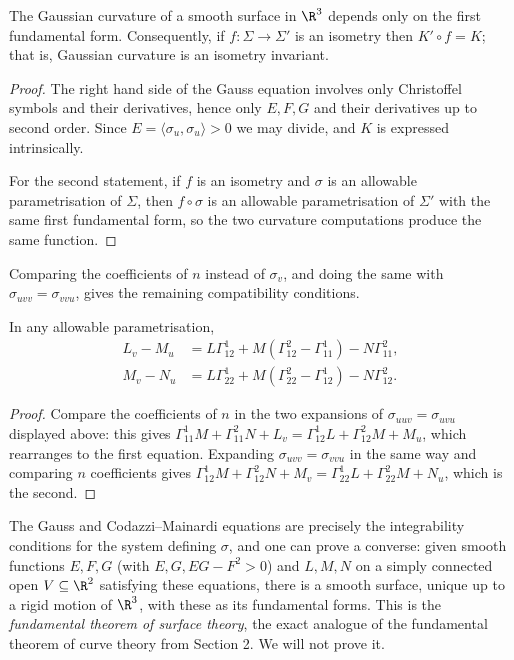\begin{theorem}
    The Gaussian curvature of a smooth surface in $\R^3$ depends only on the first fundamental form. Consequently, if $f: \Sigma \rightarrow \Sigma'$ is an isometry then $K' \circ f = K$; that is, Gaussian curvature is an isometry invariant.
\end{theorem}
\begin{proof}
    The right hand side of the Gauss equation involves only Christoffel symbols and their derivatives, hence only $E, F, G$ and their derivatives up to second order. Since $E = \langle \sigma_u, \sigma_u\rangle > 0$ we may divide, and $K$ is expressed intrinsically.

    For the second statement, if $f$ is an isometry and $\sigma$ is an allowable parametrisation of $\Sigma$, then $f\circ\sigma$ is an allowable parametrisation of $\Sigma'$ with the same first fundamental form, so the two curvature computations produce the same function.
\end{proof}

Comparing the coefficients of $n$ instead of $\sigma_v$, and doing the same with $\sigma_{uvv} = \sigma_{vvu}$, gives the remaining compatibility conditions.

\begin{theorem}
    In any allowable parametrisation,
    \begin{align*}
        L_v - M_u &= L\Gamma^1_{12} + M\left(\Gamma^2_{12}-\Gamma^1_{11}\right) - N\Gamma^2_{11}, \\
        M_v - N_u &= L\Gamma^1_{22} + M\left(\Gamma^2_{22}-\Gamma^1_{12}\right) - N\Gamma^2_{12}.
    \end{align*}
\end{theorem}
\begin{proof}
    Compare the coefficients of $n$ in the two expansions of $\sigma_{uuv} = \sigma_{uvu}$ displayed above: this gives $\Gamma^1_{11}M + \Gamma^2_{11}N + L_v = \Gamma^1_{12}L + \Gamma^2_{12}M + M_u$, which rearranges to the first equation. Expanding $\sigma_{uvv} = \sigma_{vvu}$ in the same way and comparing $n$ coefficients gives $\Gamma^1_{12}M + \Gamma^2_{12}N + M_v = \Gamma^1_{22}L + \Gamma^2_{22}M + N_u$, which is the second.
\end{proof}

\begin{remark}
    The Gauss and Codazzi--Mainardi equations are precisely the integrability conditions for the system defining $\sigma$, and one can prove a converse: given smooth functions $E, F, G$ (with $E, G, EG-F^2 > 0$) and $L, M, N$ on a simply connected open $V \subseteq \R^2$ satisfying these equations, there is a smooth surface, unique up to a rigid motion of $\R^3$, with these as its fundamental forms. This is the \emph{fundamental theorem of surface theory}, the exact analogue of the fundamental theorem of curve theory from Section 2. We will not prove it.
\end{remark}

